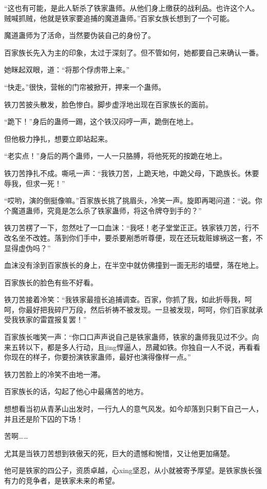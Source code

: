 \begin{this_body}
“这也有可能，是此人斩杀了铁家蛊师。从他们身上缴获的战利品。也许这个人。贼喊抓贼，他就是铁家要追捕的魔道蛊师。”百家女族长想到了一个可能。

魔道蛊师为了活命，当然要伪装自己的身份了。

百家族长先入为主的印象，太过于深刻了。但不管如何，她都要自己来确认一番。

她眯起双眼，道：“将那个俘虏带上来。”

“快走。”很快，营帐的门帘被掀开，押来一个蛊师。

铁刀苦披头散发，脸色惨白。脚步虚浮地出现在百家族长的面前。

“跪下！”身后的蛊师一踢，这个铁汉闷哼一声，跪倒在地上。

但他极力挣扎，想要立即站起来。

“老实点！”身后的两个蛊师，一人一只胳膊，将他死死的按跪在地上。

铁刀苦挣扎不成。嘶吼一声：“我铁刀苦，上跪天地，中跪父母，下跪族长。休要辱我，但求一死！”

“哎哟，演的倒挺像嘛。”百家族长挑了挑眉头，冷笑一声。旋即再喝问道：“说。你个魔道蛊师，究竟是怎么杀了铁家蛊师，将这令牌夺到手的？”

铁刀苦楞了一下，忽然吐了一口血沫：“我呸！老子堂堂正正。铁家铁刀苦，行不改名坐不改姓。落到你们手中，要杀要剐悉听尊便，现在还玩栽赃嫁祸这一套，不显得虚伪吗？”

血沫没有涂到百家族长的身上，在半空中就仿佛撞到一面无形的墙壁，落在地上。

百家族长的脸色有些不好看。

铁刀苦接着冷笑：“我铁家最擅长追捕调查。百家，你抓了我，如此折辱我，呵呵，你最好把我碎尸万段，然后祈祷不被发现。一旦被发现，呵呵，你们百家就承受我铁家的雷霆报复罢！”

百家族长嗤笑一声：“你口口声声说自己是铁家蛊师，铁家的蛊师我见过不少。向来五转以下，都是多人行动，且jing悍逼人，昂藏如铁。你独自一人不说，再看看你现在的样子，你要扮演铁家蛊师，最好也演得像样一点。”

铁刀苦脸上的冷笑不由地一滞。

百家族长的话，勾起了他心中最痛苦的地方。

想想看当初从青茅山出发时，一行九人的意气风发。如今却落到只剩下自己一人，并且还是阶下囚的下场！

苦啊……

尤其是当铁刀苦想到铁傲天的死，巨大的遗憾和惋惜，又让他更加痛楚。

他可是铁家的四公子，资质卓越，心xing坚忍，从小就被寄予厚望。是铁家族长强有力的竞争者，是铁家未来的希望。


\end{this_body}
